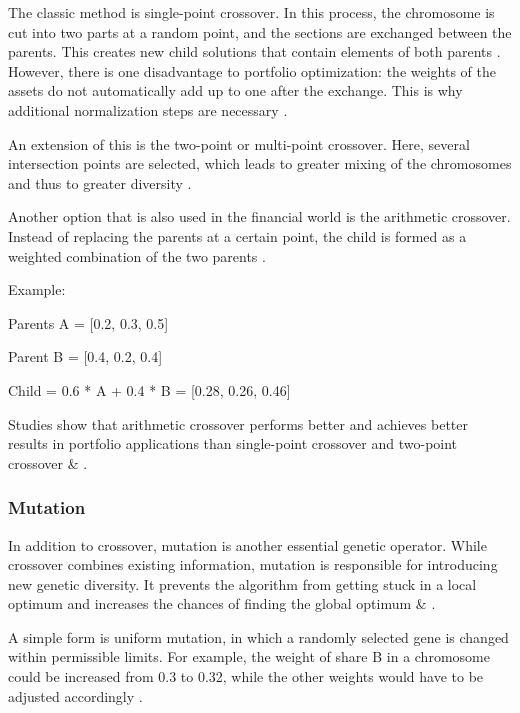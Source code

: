\documentclass{agasthesis}
\begin{document}
The classic method is single-point crossover. In this process, the chromosome is cut into two parts at a random point, and the sections are exchanged between 
the parents. This creates new child solutions that contain elements of both parents \cite[p. 8-9]{melanie_introduction_1999}. However, there is one disadvantage to portfolio 
optimization: the weights of the assets do not automatically add up to one after the exchange. This is why additional normalization steps are necessary \cite[p. 1750]{fu_adopting_2013}.

An extension of this is the two-point or multi-point crossover. Here, several intersection points are selected, which leads to greater mixing of the chromosomes 
and thus to greater diversity \cite[p. 57]{melanie_introduction_1999}. 

Another option that is also used in the financial world is the arithmetic crossover. Instead of replacing the parents at a certain point, 
the child is formed as a weighted combination of the two parents \cite[p. 10]{filograsso_adaptive_2023}.

Example:

Parents A = [0.2, 0.3, 0.5]

Parent B = [0.4, 0.2, 0.4]

Child = 0.6 * A + 0.4 * B = [0.28, 0.26, 0.46]

Studies show that arithmetic crossover performs better and achieves better results in portfolio applications 
than single-point crossover and two-point crossover \cite[p. 71]{dubinskas_investment_2017} & \cite[p. 152]{sefiane_portfolio_2012}.

\subsubsection{Mutation}
In addition to crossover, mutation is another essential genetic operator. While crossover combines existing information, 
mutation is responsible for introducing new genetic diversity. It prevents the algorithm from getting stuck in a local optimum 
and increases the chances of finding the global optimum \cite[p. 129-130]{melanie_introduction_1999} & \cite[p. 471]{kalayci_review_2017}.

A simple form is uniform mutation, in which a randomly selected gene is changed within permissible limits. For example, 
the weight of share B in a chromosome could be increased from 0.3 to 0.32, while the other weights would have to be adjusted 
accordingly \cite[p. 18]{brzek_exploration-driven_2025}.
\end{document}
